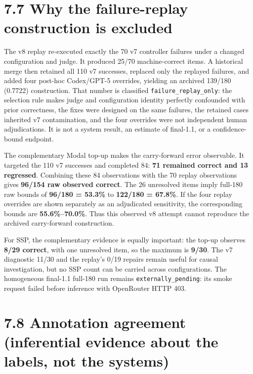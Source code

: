 \section{7.7 Why the failure-replay construction is
excluded}\label{why-the-failure-replay-construction-is-excluded}

The v8 replay re-executed exactly the 70 v7 controller failures under a
changed configuration and judge. It produced 25/70 machine-correct
items. A historical merge then retained all 110 v7 successes, replaced
only the replayed failures, and added four post-hoc Codex/GPT-5
overrides, yielding an archived 139/180 (0.7722) construction. That
number is classified \texttt{failure\_replay\_only}: the selection rule
makes judge and configuration identity perfectly confounded with prior
correctness, the fixes were designed on the same failures, the retained
cases inherited v7 contamination, and the four overrides were not
independent human adjudications. It is not a system result, an estimate
of final-1.1, or a confidence-bound endpoint.

The complementary Modal top-up makes the carry-forward error observable.
It targeted the 110 v7 successes and completed 84: \textbf{71 remained
correct and 13 regressed}. Combining these 84 observations with the 70
replay observations gives \textbf{96/154 raw observed correct}. The 26
unresolved items imply full-180 raw bounds of \textbf{96/180 = 53.3\%}
to \textbf{122/180 = 67.8\%}. If the four replay overrides are shown
separately as an adjudicated sensitivity, the corresponding bounds are
\textbf{55.6\%--70.0\%}. Thus this observed v8 attempt cannot reproduce
the archived carry-forward construction.

For SSP, the complementary evidence is equally important: the top-up
observes \textbf{8/29 correct}, with one unresolved item, so the maximum
is \textbf{9/30}. The v7 diagnostic 11/30 and the replay's 0/19 repairs
remain useful for causal investigation, but no SSP count can be carried
across configurations. The homogeneous final-1.1 full-180 run remains
\texttt{externally\_pending}: its smoke request failed before inference
with OpenRouter HTTP 403.

\section{7.8 Annotation agreement (inferential evidence about the
labels, not the
systems)}\label{annotation-agreement-inferential-evidence-about-the-labels-not-the-systems}

